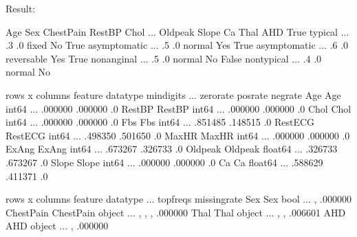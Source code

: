 \documentclass[letterpaper,12pt,english]{sphinxmanual}
\begin{document}
Result:

%
\begin{sphinxVerbatim}[commandchars=\\\{\}]
   Age    Sex     ChestPain  RestBP  Chol  ...  Oldpeak  Slope   Ca        Thal  AHD
      True       typical          ...      .3        .0       fixed   No
      True  asymptomatic          ...      .5        .0      normal  Yes
      True  asymptomatic          ...      .6        .0  reversable  Yes
      True    nonanginal          ...      .5        .0      normal   No
     False    nontypical          ...      .4        .0      normal   No

\PYG{o}{[} rows x  columns\PYG{o}{]}
         feature data\PYGZus{}type  min\PYGZus{}digits  ...  zero\PYGZus{}rate  pos\PYGZus{}rate  neg\PYGZus{}rate
Age          Age     int64             ...   .000000  .000000       .0
RestBP    RestBP     int64             ...   .000000  .000000       .0
Chol        Chol     int64             ...   .000000  .000000       .0
Fbs          Fbs     int64             ...   .851485  .148515       .0
RestECG  RestECG     int64             ...   .498350  .501650       .0
MaxHR      MaxHR     int64             ...   .000000  .000000       .0
ExAng      ExAng     int64             ...   .673267  .326733       .0
Oldpeak  Oldpeak   float64             ...   .326733  .673267       .0
Slope      Slope     int64             ...   .000000  .000000       .0
Ca            Ca   float64             ...   .588629  .411371       .0

\PYG{o}{[} rows x  columns\PYG{o}{]}
             feature data\PYGZus{}type  ...          top\PYGZus{}freqs  missing\PYGZus{}rate
Sex              Sex      bool  ...          \PYG{o}{[}, \PYG{o}{]}      .000000
ChestPain  ChestPain    object  ...  \PYG{o}{[}, , , \PYG{o}{]}      .000000
Thal            Thal    object  ...     \PYG{o}{[}, , \PYG{o}{]}      .006601
AHD              AHD    object  ...         \PYG{o}{[}, \PYG{o}{]}      .000000


\end{sphinxVerbatim}
\end{document}
